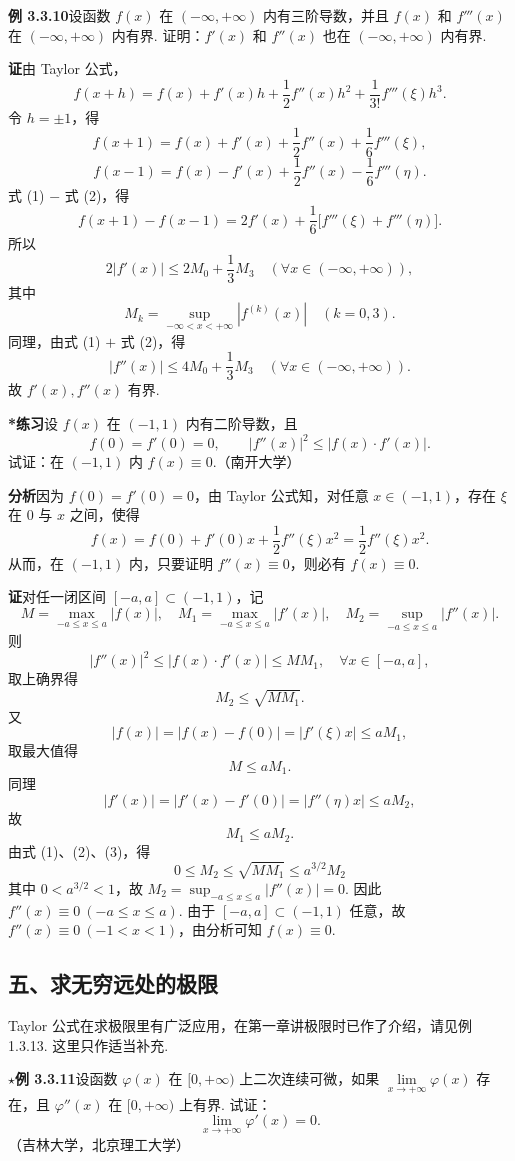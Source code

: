 \documentclass[UTF8,12pt,a4paper,fontset=fandol]{ctexart}
\begin{document}
\noindent\textbf{例 3.3.10}\quad 设函数 $f(x)$ 在 $(-\infty,+\infty)$ 内有三阶导数，并且 $f(x)$ 和 $f'''(x)$ 在 $(-\infty,+\infty)$ 内有界. 证明：$f'(x)$ 和 $f''(x)$ 也在 $(-\infty,+\infty)$ 内有界.

\noindent\textbf{证}\quad 由 Taylor 公式，
\[
  f(x+h)=f(x)+f'(x)h+\frac12f''(x)h^2+\frac{1}{3!}f'''(\xi)h^3.
\]
令 $h=\pm1$，得
\[
  f(x+1)=f(x)+f'(x)+\frac12f''(x)+\frac16f'''(\xi), \tag{1}
\]
\[
  f(x-1)=f(x)-f'(x)+\frac12f''(x)-\frac16f'''(\eta). \tag{2}
\]
式 (1) $-$ 式 (2)，得
\[
  f(x+1)-f(x-1)=2f'(x)+\frac16\bigl[f'''(\xi)+f'''(\eta)\bigr].
\]
所以
\[
  2|f'(x)|\le2M_0+\frac13M_3
  \quad(\forall x\in(-\infty,+\infty)),
\]
其中
\[
  M_k=\sup_{-\infty<x<+\infty}|f^{(k)}(x)|\quad(k=0,3).
\]
同理，由式 (1) $+$ 式 (2)，得
\[
  |f''(x)|\le4M_0+\frac13M_3
  \quad(\forall x\in(-\infty,+\infty)).
\]
故 $f'(x),f''(x)$ 有界.

\noindent\textbf{*练习}\quad 设 $f(x)$ 在 $(-1,1)$ 内有二阶导数，且
\[
  f(0)=f'(0)=0,\qquad |f''(x)|^2\le |f(x)\cdot f'(x)|.
\]
试证：在 $(-1,1)$ 内 $f(x)\equiv0$.（南开大学）

\noindent\textbf{分析}\quad 因为 $f(0)=f'(0)=0$，由 Taylor 公式知，对任意 $x\in(-1,1)$，存在 $\xi$ 在 $0$ 与 $x$ 之间，使得
\[
  f(x)=f(0)+f'(0)x+\frac12f''(\xi)x^2=\frac12f''(\xi)x^2.
\]
从而，在 $(-1,1)$ 内，只要证明 $f''(x)\equiv0$，则必有 $f(x)\equiv0$.

\noindent\textbf{证}\quad 对任一闭区间 $[-a,a]\subset(-1,1)$，记
\[
  M=\max_{-a\le x\le a}|f(x)|,\quad
  M_1=\max_{-a\le x\le a}|f'(x)|,\quad
  M_2=\sup_{-a\le x\le a}|f''(x)|.
\]
则
\[
  |f''(x)|^2\le |f(x)\cdot f'(x)|\le MM_1,\quad \forall x\in[-a,a],
\]
取上确界得
\[
  M_2\le\sqrt{MM_1}. \tag{1}
\]
又
\[
  |f(x)|=|f(x)-f(0)|=|f'(\xi)x|\le aM_1,
\]
取最大值得
\[
  M\le aM_1. \tag{2}
\]
同理
\[
  |f'(x)|=|f'(x)-f'(0)|=|f''(\eta)x|\le aM_2,
\]
故
\[
  M_1\le aM_2. \tag{3}
\]
由式 (1)、(2)、(3)，得
\[
  0\le M_2\le\sqrt{MM_1}\le a^{3/2}M_2
\]
其中 $0<a^{3/2}<1$，故 $M_2=\sup_{-a\le x\le a}|f''(x)|=0$. 因此 $f''(x)\equiv0\ (-a\le x\le a)$. 由于 $[-a,a]\subset(-1,1)$ 任意，故 $f''(x)\equiv0\ (-1<x<1)$，由分析可知 $f(x)\equiv0$.

\subsection*{五、求无穷远处的极限}

Taylor 公式在求极限里有广泛应用，在第一章讲极限时已作了介绍，请见例 1.3.13. 这里只作适当补充.

\noindent\textbf{$\star$例 3.3.11}\quad 设函数 $\varphi(x)$ 在 $[0,+\infty)$ 上二次连续可微，如果 $\lim\limits_{x\to+\infty}\varphi(x)$ 存在，且 $\varphi''(x)$ 在 $[0,+\infty)$ 上有界. 试证：
\[
  \lim_{x\to+\infty}\varphi'(x)=0.
\]
（吉林大学，北京理工大学）
\end{document}
